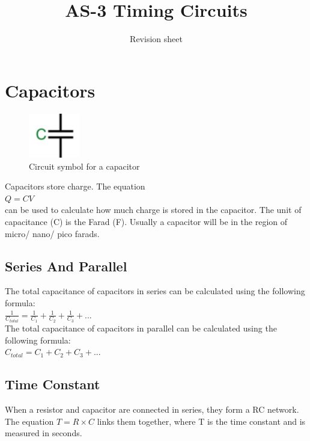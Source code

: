 \documentclass[a4paper,11pt, twocolumn]{article}
\title{AS-3 Timing Circuits}
\author{Revision sheet}
\date{}
\begin{document}
\maketitle
\thispagestyle{fancy}

\section{Capacitors}
\begin{figure}[H]
    \centering
    \includegraphics[width=0.2\textwidth]{images/capacitor.jpg}
    \caption{Circuit symbol for a capacitor}
    \label{fig:capacitor}
\end{figure}
\noindent Capacitors store charge. The equation\\
$\displaystyle Q=CV$ \\
can be used to calculate how much charge is stored in the capacitor. The unit of capacitance (C) is the Farad (F). Usually a capacitor will be in the region of micro/ nano/ pico farads.
\subsection{Series And Parallel}
The total capacitance of capacitors in series can be calculated using the following formula:\\
$\displaystyle \frac{1}{C_{total}} = \frac{1}{C_1} + \frac{1}{C_2} + \frac{1}{C_3}+ ...$\\
The total capacitance of capacitors in parallel can be calculated using the following formula:\\
$\displaystyle C_{total} = C_1 + C_2 + C_3 + ...$
\subsection{Time Constant}
When a resistor and capacitor are connected in series, they form a RC network. The equation $T=R\times C$ links them together, where T is the time constant and is measured in seconds.
\end{document}
